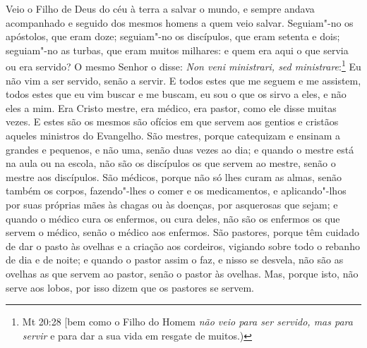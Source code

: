 Veio o Filho de Deus do céu à terra a salvar o mundo, e sempre andava
acompanhado e seguido dos mesmos homens a quem veio salvar. Seguiam"-no
os apóstolos, que eram doze; seguiam"-no os discípulos, que eram setenta
e dois; seguiam"-no as turbas, que eram muitos milhares: e quem era aqui
o que servia ou era servido? O mesmo Senhor o disse: \emph{Non veni
ministrari, sed ministrare}:\footnote{Mt 20:28 [bem como o Filho do Homem \emph{não veio para ser servido, mas para servir} e para dar a sua vida em resgate de muitos.)} Eu não vim a ser servido,
senão a servir. E todos estes que me seguem e me assistem, todos
estes que eu vim buscar e me buscam, eu sou o que os sirvo a eles, e não
eles a mim. Era Cristo mestre, era médico, era pastor, como ele disse
muitas vezes. E estes são os mesmos são ofícios em que servem aos
gentios e cristãos aqueles ministros do Evangelho. São mestres, porque
catequizam e ensinam a grandes e pequenos, e não uma, senão duas vezes
ao dia; e quando o mestre está na aula ou na escola, não são os
discípulos os que servem ao mestre, senão o mestre aos discípulos. São
médicos, porque não só lhes curam as almas, senão também os corpos,
fazendo"-lhes o comer e os medicamentos, e aplicando"-lhos por suas
próprias mães às chagas ou às doenças, por asquerosas que sejam; e
quando o médico cura os enfermos, ou cura deles, não são os enfermos os
que servem o médico, senão o médico aos enfermos. São pastores, porque
têm cuidado de dar o pasto às ovelhas e a criação aos cordeiros,
vigiando sobre todo o rebanho de dia e de noite; e quando o pastor assim
o faz, e nisso se desvela, não são as ovelhas as que servem ao pastor,
senão o pastor às ovelhas. Mas, porque isto, não serve aos lobos, por
isso dizem que os pastores se servem.

